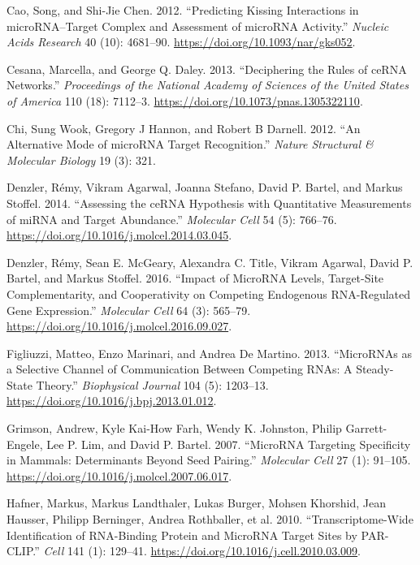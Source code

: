 \documentclass[]{article}
\begin{document}
\leavevmode\hypertarget{ref-cao_predicting_2012}{}%
Cao, Song, and Shi-Jie Chen. 2012. ``Predicting Kissing Interactions in
microRNA--Target Complex and Assessment of microRNA Activity.''
\emph{Nucleic Acids Research} 40 (10): 4681--90.
\url{https://doi.org/10.1093/nar/gks052}.

\leavevmode\hypertarget{ref-cesana_deciphering_2013}{}%
Cesana, Marcella, and George Q. Daley. 2013. ``Deciphering the Rules of
ceRNA Networks.'' \emph{Proceedings of the National Academy of Sciences
of the United States of America} 110 (18): 7112--3.
\url{https://doi.org/10.1073/pnas.1305322110}.

\leavevmode\hypertarget{ref-chi2012alternative}{}%
Chi, Sung Wook, Gregory J Hannon, and Robert B Darnell. 2012. ``An
Alternative Mode of microRNA Target Recognition.'' \emph{Nature
Structural \& Molecular Biology} 19 (3): 321.

\leavevmode\hypertarget{ref-denzler_assessing_2014}{}%
Denzler, Rémy, Vikram Agarwal, Joanna Stefano, David P. Bartel, and
Markus Stoffel. 2014. ``Assessing the ceRNA Hypothesis with Quantitative
Measurements of miRNA and Target Abundance.'' \emph{Molecular Cell} 54
(5): 766--76. \url{https://doi.org/10.1016/j.molcel.2014.03.045}.

\leavevmode\hypertarget{ref-denzler_impact_2016}{}%
Denzler, Rémy, Sean E. McGeary, Alexandra C. Title, Vikram Agarwal,
David P. Bartel, and Markus Stoffel. 2016. ``Impact of MicroRNA Levels,
Target-Site Complementarity, and Cooperativity on Competing Endogenous
RNA-Regulated Gene Expression.'' \emph{Molecular Cell} 64 (3): 565--79.
\url{https://doi.org/10.1016/j.molcel.2016.09.027}.

\leavevmode\hypertarget{ref-figliuzzi_micrornas_2013}{}%
Figliuzzi, Matteo, Enzo Marinari, and Andrea De Martino. 2013.
``MicroRNAs as a Selective Channel of Communication Between Competing
RNAs: A Steady-State Theory.'' \emph{Biophysical Journal} 104 (5):
1203--13. \url{https://doi.org/10.1016/j.bpj.2013.01.012}.

\leavevmode\hypertarget{ref-grimson_microrna_2007}{}%
Grimson, Andrew, Kyle Kai-How Farh, Wendy K. Johnston, Philip
Garrett-Engele, Lee P. Lim, and David P. Bartel. 2007. ``MicroRNA
Targeting Specificity in Mammals: Determinants Beyond Seed Pairing.''
\emph{Molecular Cell} 27 (1): 91--105.
\url{https://doi.org/10.1016/j.molcel.2007.06.017}.

\leavevmode\hypertarget{ref-hafner_transcriptome-wide_2010}{}%
Hafner, Markus, Markus Landthaler, Lukas Burger, Mohsen Khorshid, Jean
Hausser, Philipp Berninger, Andrea Rothballer, et al. 2010.
``Transcriptome-Wide Identification of RNA-Binding Protein and MicroRNA
Target Sites by PAR-CLIP.'' \emph{Cell} 141 (1): 129--41.
\url{https://doi.org/10.1016/j.cell.2010.03.009}.
\end{document}
